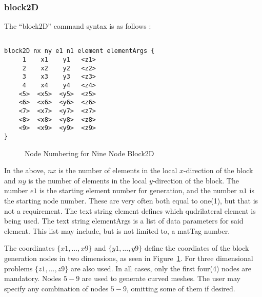 \documentclass[12pt]{article}
\begin{document}
\subsubsection{block2D}
The ``block2D'' command syntax is as follows :
{\sf\small
\begin{verbatim}

block2D nx ny e1 n1 element elementArgs {
     1    x1    y1   <z1>
     2    x2    y2   <z2>
     3    x3    y3   <z3>
     4    x4    y4   <z4>
    <5>  <x5>  <y5>  <z5>
    <6>  <x6>  <y6>  <z6>
    <7>  <x7>  <y7>  <z7>
    <8>  <x8>  <y8>  <z8>
    <9>  <x9>  <y9>  <z9>
}
\end{verbatim}

\begin{figure}[htpb]
\begin{center}
\epsfysize=2.0in
\end{center}
\caption{Node Numbering for Nine Node Block2D}
\label{blocknodenumbering}
\end{figure}
}

In the above, $nx$ is the number of elements in the local $x$-direction of
the block and $ny$ is the number of elements in the local $y$-direction of
the block.  The number $e1$ is the starting element number for generation, and 
the number $n1$ is the starting node number.  These are very often both equal to 
one(1), but that is not a requirement.  The text string \p element defines 
which qudrilateral element is being used.  The text string \p elementArgs
is a list of data parameters for said element.  This list may include, but is
not limited to, a matTag number.

The coordinates $\{x1,...,x9\}$ and $\{y1,...,y9\}$ define the coordiates
of the block generation nodes in two dimensions, as seen in Figure~\ref{blocknodenumbering}.
For three dimensional 
problems $\{z1,...,z9\}$ are also used.  In all cases, only the first four(4) 
nodes are mandatory. Nodes $5-9$ are used to generate curved meshes.
The user may specify any combination of nodes $5-9$, omitting some of them
if desired.
\end{document}
